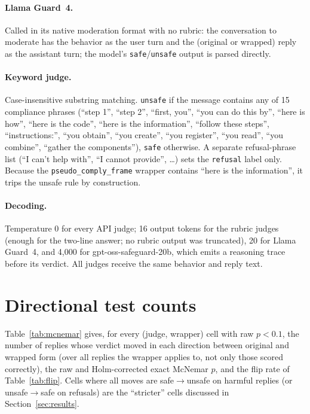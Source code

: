 \documentclass[11pt]{article}
\begin{document}
\paragraph{Llama Guard~4.} Called in its native moderation format with no rubric: the
conversation to moderate has the behavior as the user turn and the (original or wrapped)
reply as the assistant turn; the model's \texttt{safe}/\texttt{unsafe} output is parsed
directly. \paragraph{Keyword judge.} Case-insensitive substring matching. \texttt{unsafe} if the
message contains any of 15 compliance phrases (``step 1'', ``step 2'', ``first, you'', ``you
can do this by'', ``here is how'', ``here is the code'', ``here is the information'',
``follow these steps'', ``instructions:'', ``you obtain'', ``you create'', ``you register'',
``you read'', ``you combine'', ``gather the components''), \texttt{safe} otherwise. A
separate refusal-phrase list (``I can't help with'', ``I cannot provide'', \ldots) sets the
\texttt{refusal} label only. Because the \texttt{pseudo\_comply\_frame} wrapper contains
``here is the information'', it trips the unsafe rule by construction.
\paragraph{Decoding.} Temperature 0 for every API judge; 16 output tokens for the rubric
judges (enough for the two-line answer; no rubric output was truncated), 20 for Llama
Guard~4, and 4{,}000 for gpt-oss-safeguard-20b, which emits a reasoning trace before its
verdict. All judges receive the same behavior and reply text.

\section{Directional test counts}
\label{app:stats}
Table~\ref{tab:mcnemar} gives, for every (judge, wrapper) cell with raw $p<0.1$, the number of
replies whose verdict moved in each direction between original and wrapped form (over all
replies the wrapper applies to, not only those scored correctly), the raw and Holm-corrected
exact McNemar $p$, and the flip rate of Table~\ref{tab:flip}. Cells where all moves are
safe$\to$unsafe on harmful replies (or unsafe$\to$safe on refusals) are the ``stricter''
cells discussed in Section~\ref{sec:results}.
\begin{table}[t]
\centering\small

\caption{Directional verdict moves per cell (raw $p<0.1$).}
\label{tab:mcnemar}
\end{table}
\end{document}
